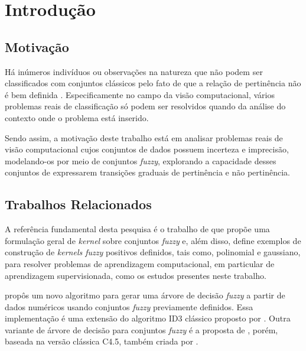 \chapter{Introdução}
\label{cap:introducao}


\section{Motivação}
\label{sec:consideracoes_preliminares}

Há inúmeros indivíduos ou observações na natureza que não podem ser classificados com conjuntos clássicos pelo fato de que a relação de pertinência não é bem definida \citep{pedrycz:98}. Especificamente no campo da visão computacional, vários problemas reais de classificação só podem ser resolvidos quando da análise do contexto onde o problema está inserido.

Sendo assim, a motivação deste trabalho está em analisar problemas reais de visão computacional cujos conjuntos de dados possuem incerteza e imprecisão, modelando-os por meio de conjuntos \emph{fuzzy}, explorando a capacidade desses conjuntos de expressarem transições graduais de pertinência e não pertinência.


\section{Trabalhos Relacionados}
\label{sec:trabalhos_relacionados}

A referência fundamental desta pesquisa é o trabalho de \citet{guevara:14} que propõe uma formulação geral de \emph{kernel} sobre conjuntos \emph{fuzzy} e, além disso, define exemplos de construção de \emph{kernels fuzzy} positivos definidos, tais como, polinomial e gaussiano, para resolver problemas de aprendizagem computacional, em particular de aprendizagem supervisionada, como os estudos presentes neste trabalho.

\citet{umano:94} propôs um novo algoritmo para gerar uma árvore de decisão \emph{fuzzy} a partir de dados numéricos usando conjuntos \emph{fuzzy} previamente definidos. Essa implementação é uma extensão do algoritmo ID3 clássico proposto por \citet{quinlan:86}. Outra variante de árvore de decisão para conjuntos \emph{fuzzy} é a proposta de \citet{cintra:13}, porém, baseada na versão clássica C4.5, também criada por \citet{quinlan:96}.


